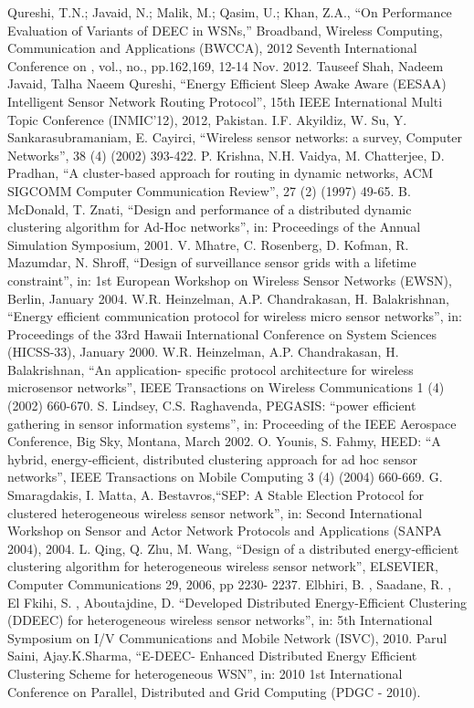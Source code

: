 \documentclass[3p,times,procedia]{elsarticle}
\begin{document}

\begin{thebibliography}{1}

 Qureshi, T.N.; Javaid, N.; Malik, M.; Qasim, U.; Khan, Z.A., ``On Performance Evaluation of Variants of DEEC in WSNs,'' Broadband, Wireless Computing, Communication and Applications (BWCCA), 2012 Seventh International Conference on , vol., no., pp.162,169, 12-14 Nov. 2012.
Tauseef Shah, Nadeem Javaid, Talha Naeem Qureshi, ``Energy Efficient Sleep Awake Aware (EESAA) Intelligent Sensor Network Routing Protocol'', 15th IEEE International Multi Topic Conference (INMIC'12), 2012, Pakistan.
I.F. Akyildiz, W. Su, Y. Sankarasubramaniam, E. Cayirci, ``Wireless sensor networks: a survey, Computer Networks'', 38 (4) (2002) 393-422.
P. Krishna, N.H. Vaidya, M. Chatterjee, D. Pradhan, ``A cluster-based approach for routing in dynamic networks, ACM SIGCOMM
Computer Communication Review'', 27 (2) (1997) 49-65.
B. McDonald, T. Znati, ``Design and performance of a distributed dynamic clustering algorithm for Ad-Hoc networks'', in: Proceedings of the Annual Simulation Symposium, 2001.
V. Mhatre, C. Rosenberg, D. Kofman, R. Mazumdar, N. Shroff, ``Design of surveillance sensor grids with a lifetime constraint'', in: 1st European Workshop on Wireless Sensor Networks (EWSN), Berlin, January 2004.
W.R. Heinzelman, A.P. Chandrakasan, H. Balakrishnan, ``Energy efficient communication protocol for wireless micro sensor networks'', in: Proceedings of the 33rd Hawaii International Conference on System Sciences (HICSS-33), January 2000.
W.R. Heinzelman, A.P. Chandrakasan, H. Balakrishnan, ``An application- specific protocol architecture for wireless microsensor networks'', IEEE Transactions on Wireless Communications 1 (4) (2002) 660-670.
S. Lindsey, C.S. Raghavenda, PEGASIS: ``power efficient gathering in sensor information systems'', in: Proceeding of the IEEE Aerospace Conference, Big Sky, Montana, March 2002.
O. Younis, S. Fahmy, HEED: ``A hybrid, energy-efficient, distributed clustering approach for ad hoc sensor networks'', IEEE Transactions on Mobile Computing 3 (4) (2004) 660-669.
G. Smaragdakis, I. Matta, A. Bestavros,``SEP: A Stable Election Protocol for clustered heterogeneous wireless sensor network'', in: Second International Workshop on Sensor and Actor Network Protocols and Applications (SANPA 2004), 2004.
L. Qing, Q. Zhu, M. Wang, ``Design of a distributed energy-efficient clustering algorithm for heterogeneous wireless sensor network'', ELSEVIER, Computer Communications 29, 2006, pp 2230- 2237.
Elbhiri, B. ,  Saadane, R. ,  El Fkihi, S. ,  Aboutajdine, D.  ``Developed Distributed Energy-Efficient Clustering (DDEEC) for heterogeneous wireless sensor networks'', in: 5th International Symposium on I/V Communications and Mobile Network (ISVC), 2010.
Parul Saini, Ajay.K.Sharma, ``E-DEEC- Enhanced Distributed Energy Efficient Clustering Scheme for heterogeneous WSN'', in: 2010 1st International Conference on Parallel, Distributed and Grid Computing (PDGC - 2010).
\end{thebibliography}
\end{document}
